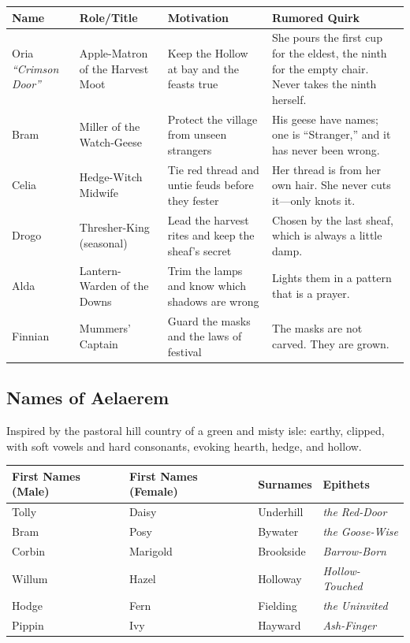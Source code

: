 \begin{longtable}{|p{}|p{}|p{}|p{}|}
\hline
\textbf{Name} & \textbf{Role/Title} & \textbf{Motivation} & \textbf{Rumored Quirk} \\
\hline
Oria \textit{``Crimson Door''} & Apple-Matron of the Harvest Moot & Keep the Hollow at bay and the feasts true & She pours the first cup for the eldest, the ninth for the empty chair. Never takes the ninth herself. \\
\hline
Bram & Miller of the Watch-Geese & Protect the village from unseen strangers & His geese have names; one is ``Stranger,'' and it has never been wrong. \\
\hline
Celia & Hedge-Witch Midwife & Tie red thread and untie feuds before they fester & Her thread is from her own hair. She never cuts it---only knots it. \\
\hline
Drogo & Thresher-King (seasonal) & Lead the harvest rites and keep the sheaf's secret & Chosen by the last sheaf, which is always a little damp. \\
\hline
Alda & Lantern-Warden of the Downs & Trim the lamps and know which shadows are wrong & Lights them in a pattern that is a prayer. \\
\hline
Finnian & Mummers' Captain & Guard the masks and the laws of festival & The masks are not carved. They are grown. \\
\hline
\end{longtable}

\subsection*{Names of Aelaerem}
\label{sec:aelaerem-names}

Inspired by the pastoral hill country of a green and misty isle: earthy, clipped, with soft vowels and hard consonants, evoking hearth, hedge, and hollow.

\begin{longtable}{|p{}|p{}|p{}|p{}|}
\hline
\textbf{First Names (Male)} & \textbf{First Names (Female)} & \textbf{Surnames} & \textbf{Epithets} \\
\hline
Tolly & Daisy & Underhill & \textit{the Red-Door} \\
\hline
Bram & Posy & Bywater & \textit{the Goose-Wise} \\
\hline
Corbin & Marigold & Brookside & \textit{Barrow-Born} \\
\hline
Willum & Hazel & Holloway & \textit{Hollow-Touched} \\
\hline
Hodge & Fern & Fielding & \textit{the Uninvited} \\
\hline
Pippin & Ivy & Hayward & \textit{Ash-Finger} \\
\hline
\end{longtable}

